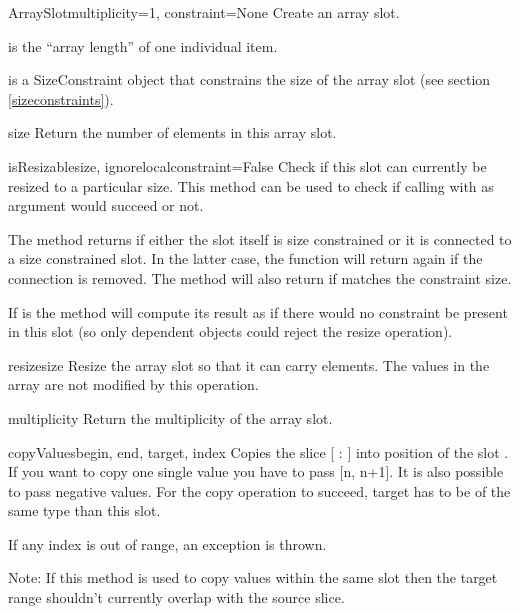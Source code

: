\begin{classdesc}{ArraySlot}{multiplicity=1, constraint=None}
Create an array slot.

 is the ``array length'' of one individual item.

 is a SizeConstraint object that constrains the size
of the array slot (see section \ref{sizeconstraints}).
\end{classdesc}

\begin{methoddesc}{size}{}
Return the number of elements in this array slot.
\end{methoddesc}

\begin{methoddesc}{isResizable}{size, ignorelocalconstraint=False}
Check if this slot can currently be resized to a particular size.
This method can be used to check if calling  with
 as argument would succeed or not.

The method returns  if either the slot itself is size
constrained or it is connected to a size constrained slot. In the
latter case, the function will return  again if the
connection is removed. The method will also return  if
 matches the constraint size.

If  is  the method will
compute its result as if there would no constraint be present in this 
slot (so only dependent objects could reject the resize operation).
\end{methoddesc}

\begin{methoddesc}{resize}{size}
Resize the array slot so that it can carry  elements.
The values in the array are not modified by this operation.
\end{methoddesc}

\begin{methoddesc}{multiplicity}{}
Return the multiplicity of the array slot.
\end{methoddesc}

\begin{methoddesc}{copyValues}{begin, end, target, index}
Copies the slice [ : ] into position 
of the slot . 
If you want to copy one single value you have to pass [n, n+1]. It is also
possible to pass negative values.
For the copy operation to succeed, target has to be of the same type
than this slot.

If any index is out of range, an exception is thrown.

Note: If this method is used to copy values within the same slot then
the target range shouldn't currently overlap with the source slice.
\end{methoddesc}

